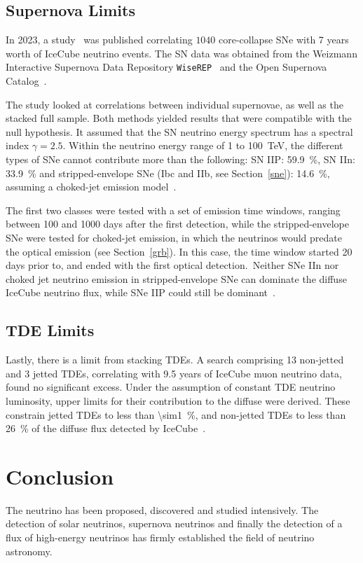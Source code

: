 \subsection{Supernova Limits}
In 2023, a study~ was published correlating $1040$ core-collapse SNe with 7 years worth of IceCube neutrino events. The SN data was obtained from the Weizmann Interactive Supernova Data Repository \texttt{WiseREP}~ and the Open Supernova Catalog~.

The study looked at correlations between individual supernovae, as well as the stacked full sample. Both methods yielded results that were compatible with the null hypothesis. It assumed that the SN neutrino energy spectrum has a spectral index $\gamma=2.5$. Within the neutrino energy range of 1 to \SI{100}{\tera\eV}, the different types of SNe cannot contribute more than the following: SN IIP: \SI{59.9}{\percent}, SN IIn: \SI{33.9}{\percent} and stripped-envelope SNe (Ibc and IIb, see Section~\ref{sne}): \SI{14.6}{\percent}, assuming a choked-jet emission model~\cite{Necker2023}.

The first two classes were tested with a set of emission time windows, ranging between 100 and 1000 days after the first detection, while the stripped-envelope SNe were tested for choked-jet emission, in which the neutrinos would predate the optical emission (see Section~\ref{grb}). In this case, the time window started 20 days prior to, and ended with the first optical detection.\ Neither SNe IIn nor choked jet neutrino emission in stripped-envelope SNe can dominate the diffuse IceCube neutrino flux, while SNe IIP could still be dominant~\cite{Necker2023}.

\subsection{TDE Limits}
Lastly, there is a limit from stacking TDEs. A search comprising 13 non-jetted and 3 jetted TDEs, correlating with 9.5 years of IceCube muon neutrino data, found no significant excess. Under the assumption of constant TDE neutrino luminosity, upper limits for their contribution to the diffuse were derived. These constrain jetted TDEs to less than \SI{\sim1}{\percent}, and non-jetted TDEs to less than \SI{26}{\percent} of the diffuse flux detected by IceCube~.

\section{Conclusion}
The neutrino has been proposed, discovered and studied intensively. The detection of solar neutrinos, supernova neutrinos and finally the detection of a flux of high-energy neutrinos has firmly established the field of neutrino astronomy.

